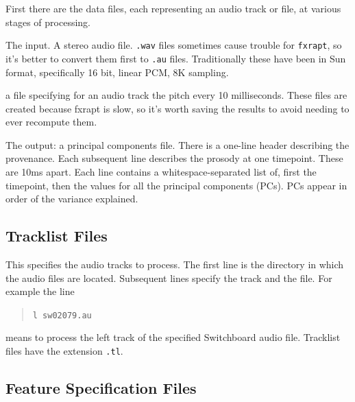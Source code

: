 \documentclass[11pt]{article}
\begin{document}
First there are the data files, each representing an audio track or
file, at various stages of processing.

\begin{description}   \setlength{\itemsep}{0pt}\setlength{\parskip}{0pt}

\item [---.au, .wav] The input.  A stereo audio file.  {\tt .wav}
  files sometimes cause trouble for {\tt fxrapt}, so it's better to
  convert them first to {\tt .au} files.  Traditionally these have
  been in Sun format, specifically 16 bit, linear PCM, 8K sampling.

\item[---f0.mat] a file specifying for an audio track the pitch every
  10 milliseconds.  These files are created because fxrapt is slow, so
  it's worth saving the results to avoid needing to ever recompute
  them.

\item[---.pc] The output: a principal components file.  There is a
  one-line header describing the provenance.  Each subsequent line
  describes the prosody at one timepoint.  These are 10ms apart.  Each
  line contains a whitespace-separated list of, first the timepoint,
  then the values for all the principal components (PCs).  PCs appear
  in order of the variance explained.
\end{description}


\subsection{Tracklist Files}       \label{tracklist-files}

This specifies the audio tracks to process.  The first line is the
directory in which the audio files are located.  Subsequent lines
specify the track and the file.  For example the line

\begin{quote}
\verb+l sw02079.au+
\end{quote}

means to process the left track of the specified Switchboard audio
file.  Tracklist files have the extension {\tt .tl}. 


\subsection{Feature Specification Files}     \label{featurespec-files}
\end{document}
